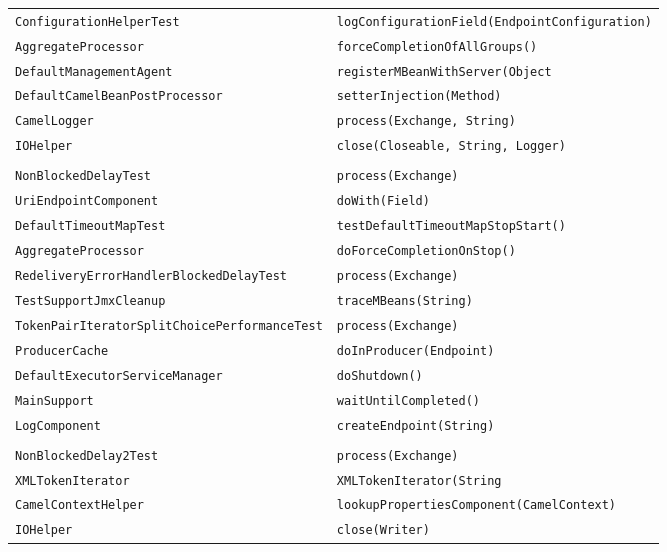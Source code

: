 \begin{center}
\begin{longtable}{ll}
\lstinline/ConfigurationHelperTest/&{\lstinline/logConfigurationField(EndpointConfiguration)/}\\
\lstinline/AggregateProcessor/&{\lstinline/forceCompletionOfAllGroups()/}\\
\lstinline/DefaultManagementAgent/&{\lstinline/registerMBeanWithServer(Object/}\\
\lstinline/DefaultCamelBeanPostProcessor/&{\lstinline/setterInjection(Method)/}\\
\lstinline/CamelLogger/&{\lstinline/process(Exchange, String)/}\\
\lstinline/IOHelper/&{\lstinline/close(Closeable, String, Logger)/}\\
\raisebox{-13pt}{\shortstack{\lstinline/AsyncEndpointRedeliveryErrorHandler/-\\\lstinline/NonBlockedDelayTest/}}&{\lstinline/process(Exchange)/}\\
\lstinline/UriEndpointComponent/&{\lstinline/doWith(Field)/}\\
\lstinline/DefaultTimeoutMapTest/&{\lstinline/testDefaultTimeoutMapStopStart()/}\\
\lstinline/AggregateProcessor/&{\lstinline/doForceCompletionOnStop()/}\\
\lstinline/RedeliveryErrorHandlerBlockedDelayTest/&{\lstinline/process(Exchange)/}\\
\lstinline/TestSupportJmxCleanup/&{\lstinline/traceMBeans(String)/}\\
\lstinline/TokenPairIteratorSplitChoicePerformanceTest/&{\lstinline/process(Exchange)/}\\
\lstinline/ProducerCache/&{\lstinline/doInProducer(Endpoint)/}\\
\lstinline/DefaultExecutorServiceManager/&{\lstinline/doShutdown()/}\\
\lstinline/MainSupport/&{\lstinline/waitUntilCompleted()/}\\
\lstinline/LogComponent/&{\lstinline/createEndpoint(String)/}\\
\raisebox{-13pt}{\shortstack{\lstinline/AsyncEndpointRedeliveryErrorHandler/-\\\lstinline/NonBlockedDelay2Test/}}&{\lstinline/process(Exchange)/}\\
\lstinline/XMLTokenIterator/&{\lstinline/XMLTokenIterator(String/}\\
\lstinline/CamelContextHelper/&{\lstinline/lookupPropertiesComponent(CamelContext)/}\\
\lstinline/IOHelper/&{\lstinline/close(Writer)/}\\

\end{longtable}
\end{center}
